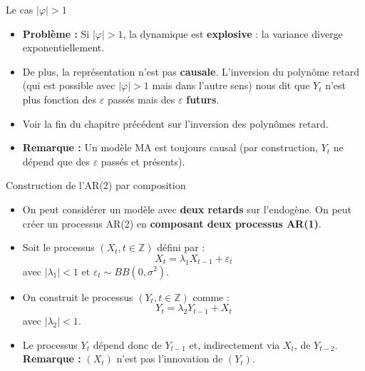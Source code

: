 \documentclass[11pt,aspectratio=169]{beamer}
\newcommand{\Z}{\mathbb{Z}}
\begin{document}
\begin{frame}{Le cas $|\varphi| > 1$}

\begin{itemize}

\item \textbf{Problème :} Si $|\varphi| > 1$, la dynamique est \textbf{explosive} : la variance diverge exponentiellement.\newline

\item De plus, la représentation n'est pas \textbf{causale}. L'inversion du polynôme retard (qui est possible avec $|\varphi| > 1$ mais dans l'autre sens) nous dit que $Y_t$ n'est plus fonction des $\varepsilon$ passés mais des $\varepsilon$ \textbf{futurs}.\newline

\item Voir la fin du chapitre précédent sur l'inversion des polynômes retard.\newline

\item \textbf{Remarque :} Un modèle MA est toujours causal (par construction, $Y_t$ ne dépend que des $\varepsilon$ passés et présents).

\end{itemize}
\end{frame}


\begin{frame}{Construction de l'AR(2) par composition}

\begin{itemize}

\item On peut considérer un modèle avec \textbf{deux retards} sur l'endogène. On peut créer un processus AR(2) en \textbf{composant deux processus AR(1)}.\newline

\item Soit le processus $(X_t, t \in \Z)$ défini par :
\[
X_t = \lambda_1 X_{t-1} + \varepsilon_t
\]
avec $|\lambda_1| < 1$ et $\varepsilon_t \sim BB(0, \sigma^2)$.\newline

\item On construit le processus $(Y_t, t \in \Z)$ comme :
\[
Y_t = \lambda_2 Y_{t-1} + X_t
\]
avec $|\lambda_2| < 1$.\newline

\item Le processus $Y_t$ dépend donc de $Y_{t-1}$ et, indirectement via $X_t$, de $Y_{t-2}$. \textbf{Remarque :} $(X_t)$ n'est pas l'innovation de $(Y_t)$.

\end{itemize}
\end{frame}
\end{document}
